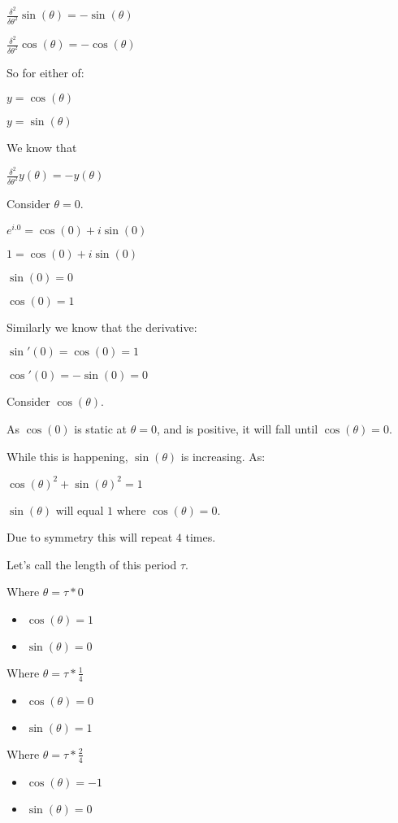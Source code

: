 \(\frac{\delta^2 }{\delta \theta^2}\sin (\theta )=-\sin (\theta )\)

\(\frac{\delta^2 }{\delta \theta^2}\cos (\theta )=-\cos (\theta )\)

So for either of:

\(y=\cos (\theta )\)

\(y=\sin (\theta )\)

We know that

\(\frac{\delta^2 }{\delta \theta^2}y(\theta )=-y(\theta )\)

Consider \(\theta =0\).

\(e^{i.0}=\cos (0)+i\sin (0)\)

\(1=\cos (0)+i\sin (0)\)

\(\sin (0)=0\)

\(\cos (0)=1\)

Similarly we know that the derivative:

\(\sin'(0)=\cos(0)=1\)

\(\cos'(0)=-\sin(0)=0\)

Consider \(\cos(\theta )\). 

As \(\cos (0)\) is static at \(\theta =0\), and is positive, it will fall until \(\cos (\theta )=0\).

While this is happening, \(\sin (\theta )\) is increasing. As:

\(\cos (\theta )^2+\sin (\theta )^2=1\)

\(\sin (\theta )\) will equal \(1\) where \(\cos (\theta )=0\).

Due to symmetry this will repeat \(4\) times.

Let's call the length of this period \(\tau \).

Where \(\theta =\tau *0\)

\begin{itemize}
\item \(\cos (\theta )=1\)
\item \(\sin (\theta )=0\)
\end{itemize}

Where \(\theta =\tau *\frac{1}{4}\)

\begin{itemize}
\item \(\cos (\theta )=0\)
\item \(\sin (\theta )=1\)
\end{itemize}

Where \(\theta =\tau *\frac{2}{4}\)

\begin{itemize}
\item \(\cos (\theta )=-1\)
\item \(\sin (\theta )=0\)
\end{itemize}

